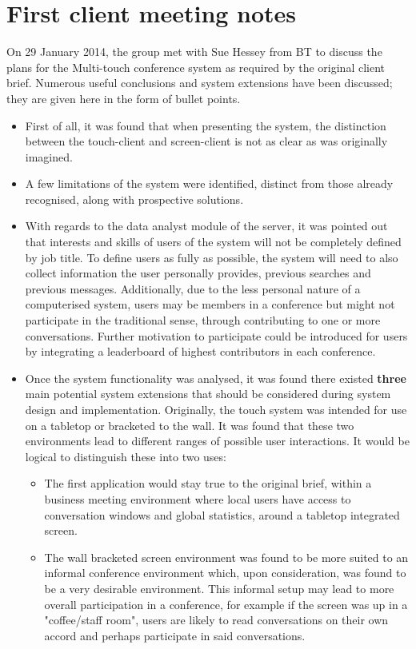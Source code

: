 \documentclass[12p, a4paper, onecolumn]{report}
\begin{document}
\section{First client meeting notes}

On 29 January 2014, the group met with Sue Hessey from BT to discuss the plans for the Multi-touch conference system as required by the original client brief. Numerous useful conclusions and system extensions have been discussed; they are given here in the form of bullet points.
\begin{itemize}
\item First of all, it was found that when presenting the system, the distinction between the touch-client and screen-client is not as clear as was originally imagined.
\item A few limitations of the system were identified, distinct from those already recognised, along with prospective solutions.
\item With regards to the data analyst module of the server, it was pointed out that interests and skills of users of the system will not be completely defined by job title. To define users as fully as possible, the system will need to also collect information the user personally provides, previous searches and previous messages. Additionally, due to the less personal nature of a computerised system, users may be members in a conference but might not participate in the traditional sense, through contributing to one or more conversations. Further motivation to participate could be introduced for users by integrating a leaderboard of highest contributors in each conference.
\item Once the system functionality was analysed, it was found there existed \textbf{three} main potential system extensions that should be considered during system design and implementation. Originally, the touch system was intended for use on a tabletop or bracketed to the wall. It was found that these two environments lead to different ranges of possible user interactions. It would be logical to distinguish these into two uses:
\begin{itemize}
\item The first application would stay true to the original brief, within a business meeting environment where local users have access to conversation windows and global statistics, around a tabletop integrated screen.
\item The wall bracketed screen environment was found to be more suited to an informal conference environment which, upon consideration, was found to be a very desirable environment. This informal setup may lead to more overall participation in a conference, for example if the screen was up in a "coffee/staff room", users are likely to read conversations on their own accord and perhaps participate in said conversations.

\end{itemize}
\end{itemize}
\end{document}

